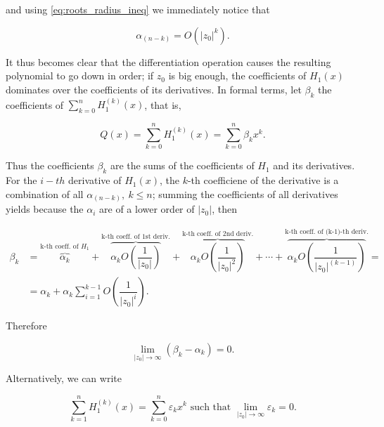 	\noindent and using \eqref{eq:roots_radius_ineq} we immediately notice that 

\begin{equation} \alpha_{(n-k)} = O\left(\left\lvert z_0\right\rvert^k\right) .\end{equation}

	It thus becomes clear that the differentiation operation causes the resulting polynomial to go down in order; if $z_0$ is big enough, the coefficients of $H_1(x)$ dominates over the coefficients of its derivatives. In formal terms, let $\beta_k$ the coefficients of $\sum_{k=0}^n H_1^{(k)}(x)$, that is,

\begin{equation} Q(x) = \sum_{k=0}^n H_1^{(k)}(x) = \sum_{k=0}^n \beta_kx^k .\end{equation}

	Thus the coefficients $\beta_k$ are the sums of the coefficients of $H_1$ and its derivatives. For the $i-th$ derivative of $H_1(x)$, the $k$-th coefficiene of the derivative is a combination of all $\alpha_{(n-k)},\ k\leq n$; summing the coefficients of all derivatives yields because the $\alpha_i$ are of a lower order of $\left\lvert z_0\right\rvert$, then

\begin{align}
	\beta_k &= \overbrace{\alpha_k}^{\text{k-th coeff. of } H_1} + \overbrace{\alpha_k O \left(\dfrac{1}{\left\lvert z_0\right\rvert}\right)}^{\text{k-th coeff. of 1st deriv.}} + \overbrace{\alpha_k O \left(\dfrac{1}{\left\lvert z_0\right\rvert^2}\right)}^{\text{k-th coeff. of 2nd deriv.}} + \cdots + \overbrace{\alpha_k O \left(\dfrac{1}{\left\lvert z_0\right\rvert^{(k-1)}}\right)}^{\text{k-th coeff. of (k-1)-th deriv.}} = \nonumber\\[3mm]
%
	&= \alpha_k + \alpha_k \sum_{i=1}^{k-1} O\left(\dfrac{1}{\left\lvert z_0\right\rvert^i}\right).
\end{align}

	Therefore

\begin{equation} \lim\limits_{\left\lvert z_0\right\rvert\to\infty} \left(\beta_k - \alpha_k\right) = 0 .\end{equation}

	Alternatively, we can write 

\begin{equation} \sum_{k=1}^n H_1^{(k)}(x) = \sum_{k=0}^n \varepsilon_kx^k \text{ such that } \lim\limits_{\left\lvert z_0\right\vert\to\infty} \varepsilon_k = 0 .\end{equation}

